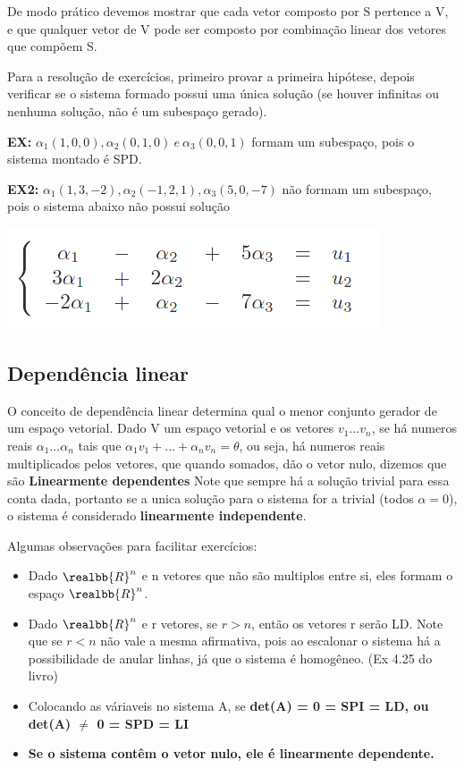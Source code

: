 \documentclass[letterpaper, 11pt]{article}
\begin{document}
De modo prático devemos mostrar que cada vetor composto por S pertence a V, e que qualquer vetor de V pode ser composto por combinação linear dos vetores que compõem S.

Para a resolução de exercícios, primeiro provar a primeira hipótese, depois verificar se o sistema formado possui uma única solução (se houver infinitas ou nenhuma solução, não é um subespaço gerado).

\textbf{EX:} \(\alpha_1(1,0,0), \alpha_2(0,1,0) \ e \ \alpha_3(0,0,1)\) formam um subespaço, pois o sistema montado é SPD.

\textbf{EX2:} \(\alpha_1(1,3,-2), \alpha_2(-1,2,1), \alpha_3(5,0,-7)\) não formam um subespaço, pois o sistema abaixo não possui solução

\begin{center}
\includegraphics[width=.9\linewidth]{./img/sist1.png}
\end{center}

\subsection{Dependência linear}
\label{sec:orgee4002c}
O conceito de dependência linear determina qual o menor conjunto gerador de um espaço vetorial. Dado V um espaço vetorial e os vetores \(v_1 ... v_n\), se há numeros reais \(\alpha_1 ... \alpha_n\) tais que \(\alpha_1 v_1 + ... + \alpha_n v_n = \theta\), ou seja, há numeros reais multiplicados pelos vetores, que quando somados, dão o vetor nulo, dizemos que são \textbf{Linearmente dependentes}
Note que sempre há a solução trivial para essa conta dada, portanto se a unica solução para o sistema for a trivial (todos \(\alpha = 0\)), o sistema é considerado \textbf{linearmente independente}.

Algumas observações para facilitar exercícios:
\begin{itemize}
\item Dado \(\realbb{R}^n\) e n vetores que não são multiplos entre si, eles formam o espaço \(\realbb{R}^n\).
\item Dado \(\realbb{R}^n\) e r vetores, se \(r > n\), então os vetores r serão LD. Note que se  \(r < n\) não vale a mesma afirmativa, pois ao escalonar o sistema há a possibilidade de anular linhas, já que o sistema é homogêneo. (Ex 4.25 do livro)
\item Colocando as váriaveis no sistema A, se \textbf{det(A) = 0 = SPI = LD, ou det(A) \(\ne\) 0 = SPD = LI}
\item \textbf{Se o sistema contêm o vetor nulo, ele é linearmente dependente.}
\end{itemize}
\end{document}

